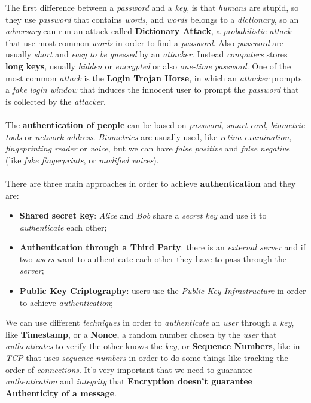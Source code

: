 \documentclass{article}
\begin{document}
The first difference between a \emph{password} and a \emph{key}, is that \emph{humans} are stupid, so they use \emph{password} that contains \emph{words}, and \emph{words} belongs to a \emph{dictionary}, so an \emph{adversary} can run an attack called \textbf{Dictionary Attack}, a \emph{probabilistic attack} that use most common \emph{words} in order to find a \emph{password}. Also \emph{password} are usually \emph{short} and \emph{easy to be guessed} by an \emph{attacker}. Instead \emph{computers} stores \textbf{long keys}, usually \emph{hidden} or \emph{encrypted} or also \emph{one-time password}. One of the most common \emph{attack} is the \textbf{Login Trojan Horse}, in which an \emph{attacker} prompts a \emph{fake login window} that induces the innocent user to prompt the \emph{password} that is collected by the \emph{attacker}. \\\\
The \textbf{authentication of people} can be based on \emph{password}, \emph{smart card}, \emph{biometric tools} or \emph{network address}. \emph{Biometrics} are usually used, like \emph{retina examination}, \emph{fingeprinting reader} or \emph{voice}, but we can have \emph{false positive} and \emph{false negative} (like \emph{fake fingerprints}, or \emph{modified voices}).  \\\\
There are three main approaches in order to achieve \textbf{authentication} and they are:
\begin{itemize}
\item \textbf{Shared secret key}: \emph{Alice} and \emph{Bob} share a \emph{secret key} and use it to \emph{authenticate} each other;
\item \textbf{Authentication through a Third Party}: there is an \emph{external server} and if two \emph{users} want to authenticate each other they have to pass through the \emph{server};
\item \textbf{Public Key Criptography}: users use the \emph{Public Key Infrastructure} in order to achieve \emph{authentication};
\end{itemize}
We can use different \emph{techniques} in order to \emph{authenticate} an \emph{user} through a \emph{key}, like \textbf{Timestamp}, or a \textbf{Nonce}, a random number chosen by the \emph{user} that \emph{authenticates} to verify the other knows the \emph{key}, or \textbf{Sequence Numbers}, like in \emph{TCP} that uses \emph{sequence numbers} in order to do some things like tracking the order of \emph{connections}. It's very important that we need to guarantee \emph{authentication} and \emph{integrity} that \textbf{Encryption doesn't guarantee Authenticity of a message}. 
\end{document}
